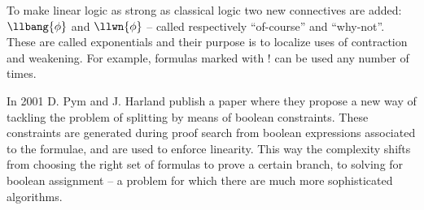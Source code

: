 To make linear logic as strong as classical logic two new connectives are added: $\llbang{\phi}$ and $\llwn{\phi}$ -- called respectively ``of-course'' and ``why-not''.
These are called exponentials and their purpose is to localize uses of contraction and weakening.
For example, formulas marked with $!$ can be used any number of times. %




In 2001 D. Pym and J. Harland publish a paper \cite{HarlandPym} where they propose a new way of tackling the problem of splitting by means of boolean constraints.
These constraints are generated during proof search from boolean expressions associated to the formulae, and are used to enforce linearity.
This way the complexity shifts from choosing the right set of formulas to prove a certain branch, to solving for boolean assignment -- a problem for which there are much more sophisticated algorithms.


